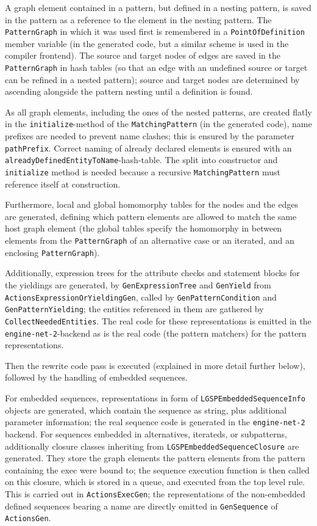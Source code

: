 A graph element contained in a pattern, but defined in a nesting pattern, is saved in the pattern as a reference to the element in the nesting pattern. 
The \texttt{Pattern\-Graph} in which it was used first is remembered in a \texttt{Point\-Of\-Definition} member variable (in the generated code, but a similar scheme is used in the compiler frontend).
The source and target nodes of edges are saved in the \texttt{Pattern\-Graph} in hash tables (so that an edge with an undefined source or target can be refined in a nested pattern); source and target nodes are determined by ascending alongside the pattern nesting until a definition is found.

As all graph elements, including the ones of the nested patterns, are created flatly in the \texttt{initialize}-method of the \texttt{Matching\-Pattern} (in the generated code), name prefixes are needed to prevent name clashes; this is ensured by the parameter \texttt{path\-Prefix}.
Correct naming of already declared elements is ensured with an \texttt{already\-Defined\-Entity\-To\-Name}-hash-table.
The split into constructor and \texttt{initialize} method is needed because a recursive \texttt{Matching\-Pattern} must reference itself at construction.

Furthermore, local and global homomorphy tables for the nodes and the edges are generated, defining which pattern elements are allowed to match the same host graph element (the global tables specify the homomorphy in between elements from the \texttt{Pattern\-Graph} of an alternative case or an iterated, and an enclosing \texttt{Pattern\-Graph}).

Additionally, expression trees for the attribute checks and statement blocks for the yieldings are generated, by \texttt{Gen\-Expression\-Tree} and \texttt{Gen\-Yield} from \texttt{Actions\-Expression\-Or\-Yielding\-Gen}, called by \texttt{Gen\-Pattern\-Condition} and \texttt{Gen\-Pattern\-Yielding}; the entities referenced in them are gathered by \texttt{Collect\-Needed\-Entities}.
The real code for these representations is emitted in the \texttt{engine-net-2}-backend as is the real code (the pattern matchers) for the pattern representations.

Then the rewrite code pass is executed (explained in more detail further below), followed by the handling of embedded sequences.

For embedded sequences, representations in form of \texttt{LGSP\-Embedded\-Sequence\-Info} objects are generated, which contain the sequence as string, plus additional parameter information; the real sequence code is generated in the \texttt{engine-net-2} backend.
For sequences embedded in alternatives, iterateds, or subpatterns, additionally closure classes inheriting from \texttt{LGSP\-Embedded\-Sequence\-Closure} are generated.
They store the graph elements the pattern elements from the pattern containing the exec were bound to; the sequence execution function is then called on this closure, which is stored in a queue, and executed from the top level rule.
This is carried out in \texttt{ActionsExecGen}; the representations of the non-embedded defined sequences bearing a name are directly emitted in \texttt{Gen\-Sequence} of \texttt{ActionsGen}.

